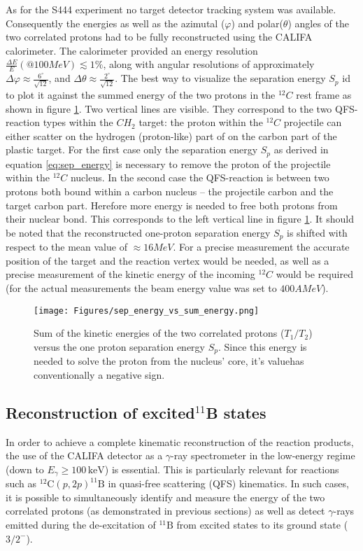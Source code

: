 As for the S444 experiment no target detector tracking system was available. Consequently the energies as well as the azimutal ($\varphi$) and polar($\theta$) angles of the two correlated protons had to be fully reconstructed using the CALIFA calorimeter. The calorimeter provided an energy resolution $\frac{\Delta E}{E}(@100MeV) \lesssim 1 \%$, along with angular resolutions of approximately  $\Delta \varphi \approx \frac{6^{\circ}}{\sqrt{12}}$, and $\Delta \theta \approx \frac{2^{\circ}}{\sqrt{12}}$.
The best way to visualize the separation energy $S_p$ id to plot it against the summed energy of the two protons in the $^{12}C$ rest frame as shown in figure \ref{fig:sep_energy}. Two vertical lines are visible. They correspond to the two QFS-reaction types within the $CH_2$ target: the proton within the $^{12}C$ projectile can either scatter on the hydrogen (proton-like) part of on the carbon part of the plastic target. For the first case only the separation energy $S_p$ as derived in equation \ref{eq:sep_energy} is necessary to remove the proton of the projectile within the $^{12}C$ nucleus. In the second case the QFS-reaction is between two protons both bound within a carbon nucleus -- the projectile carbon and the target carbon part. Herefore more energy is needed to free both protons from their nuclear bond. This corresponds to the left vertical line in figure \ref{fig:sep_energy}. It should be noted that the reconstructed one-proton separation energy $S_p$ is shifted with respect to the mean value of $\approx 16 MeV$. For a precise measurement the accurate position of the target and the reaction vertex would be needed, as well as a precise measurement of the kinetic energy of the incoming $^{12}C$ would be required (for the actual measurements the beam energy value was set to $400 AMeV$). 
\begin{figure}[htpb]
    \centering
    \texttt{[image: Figures/sep\_energy\_vs\_sum\_energy.png]}
    \caption{
	Sum of the kinetic energies of the two correlated protons ($T_1/T_2$) versus the one proton separation energy $S_p$. Since this energy is needed to solve the proton from the nucleus' core, it's valuehas conventionally a negative sign.  	 
    }
    \label{fig:sep_energy}
\end{figure}

\subsection{Reconstruction of excited$ ^{11}$B states}
In order to achieve a complete kinematic reconstruction of the reaction products, the use of the CALIFA detector as a $\gamma$-ray spectrometer in the low-energy regime (down to $E_\gamma \geq 100\,\mathrm{keV}$) is essential. This is particularly relevant for reactions such as $^{12}\mathrm{C}(p,2p)^{11}\mathrm{B}$ in quasi-free scattering (QFS) kinematics. In such cases, it is possible to simultaneously identify and measure the energy of the two correlated protons (as demonstrated in previous sections) as well as detect $\gamma$-rays emitted during the de-excitation of $^{11}\mathrm{B}$ from excited states to its ground state ($3/2^-$).

